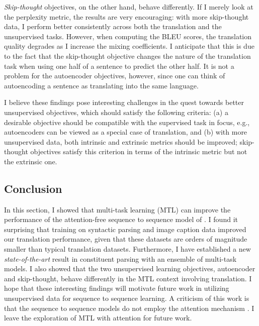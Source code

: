 {\it Skip-thought} objectives, on the other hand, behave differently. If I
merely look at the perplexity metric, the results are very encouraging: with
more skip-thought data, I perform better consistently across both the
translation and the unsupervised tasks. However, when computing the BLEU scores,
the translation quality degrades as I increase the mixing coefficients. I anticipate that
this is due to the fact that the skip-thought objective changes the nature of
the translation task when using one half of a sentence to predict the other
half. It is not a problem for the autoencoder objectives, however, since one can
think of autoencoding a sentence as translating into the same language.

I believe these findings pose interesting challenges in the quest towards  better
unsupervised objectives, which should satisfy the following criteria: (a)
a desirable objective should be compatible with the supervised task in focus, e.g.,
autoencoders can be viewed as a special case of translation,
and (b) with more unsupervised data, both intrinsic and extrinsic metrics
should be improved; skip-thought objectives satisfy this criterion in terms of
the intrinsic metric but not the extrinsic one.

\subsection{Conclusion}
\label{sec:conclude}
In this section, I showed that multi-task learning (MTL) can improve the
performance of the attention-free sequence to sequence model of
\citep{sutskever14}.  I found it surprising that training on syntactic
parsing and image caption data improved our translation performance, given
that these 
datasets are orders of magnitude smaller than typical translation
datasets. 
Furthermore, I have established a new {\it state-of-the-art} result in
constituent parsing with an ensemble of multi-task models.
I also showed that the two unsupervised
learning objectives, autoencoder and skip-thought, behave differently in the MTL context
involving translation. I hope that these interesting
findings will motivate future work in utilizing unsupervised data for sequence
to sequence learning.
A criticism of this work is that the sequence to sequence models do not employ
the attention mechanism \citep{bog15}.  I leave the exploration
of MTL with attention for future work.


